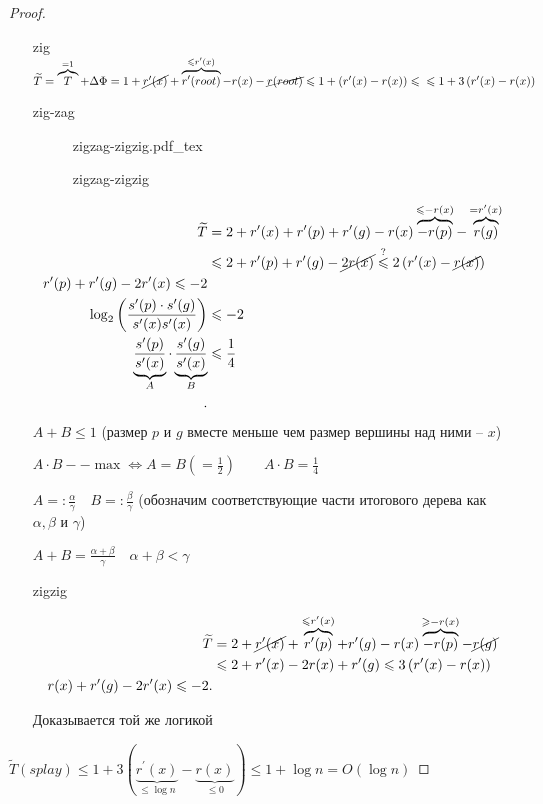 \documentclass{book}
\newcommand{\p}[1]{#1^{\prime}}
\theoremstyle{definition}
\newcommand{\ov}[2]{\overset{#1}{#2}}
\newcommand{\tl}[1]{\widetilde{#1}}
\newcommand{\incfig}[1]{%
    \def\svgwidth{\columnwidth}
    {#1.pdf_tex}
}
\begin{document}
\begin{proof}
    \begin{itemize}
        \item []
        \item [zig] $\tl T = \overbrace{T}^{=1} + \Delta \Phi = 1 + \cancel{\p r(x)} + \overbrace{\p r(root)}^{\leqslant \p r(x)} - r(x) - \cancel{r(root)} \leqslant 1 + \left( \p r(x) - r(x) \right) \leqslant\\\leqslant 1+ 3\left( \p r(x) - r(x) \right)  $
        \item [zig-zag] 
\begin{figure}[!ht]
    \centering
    \incfig{zigzag-zigzig}
    \caption{zigzag-zigzig}
\end{figure}
\begin{align*}
    \tl T &= 2 + \p r(x) + \p r(p) + \p r(g) - r(x) \overbrace{-r(p)}^{\leqslant -r(x)} - \overbrace{r(g)}^{=\p r(x)}\\
          &\leqslant  2+\p r(p) + \p r(g) - \cancel{2r(x)} \ov{?}{\leqslant} 2\left( \p r(x) - \cancel{r(x)} \right)  \\
    \p r(p) + \p r(g) - 2\p r(x) \leqslant -2\\
    \log _2\left( \frac{\p s(p)\cdot \p s(g)}{\p s(x)\p s(x)} \right) &\leqslant -2 \\
    \underbrace{\frac{\p s(p)}{\p s(x)}}_A\cdot \underbrace{\frac{\p s(g)}{\p s(x)}}_B&\leqslant \frac{1}{4}\\    
.\end{align*}
$A+B\leqslant 1$ (размер $p$ и $g$ вместе меньше чем размер вершины над ними --  $x$)

$A\cdot B -- \max \iff A=B(=\frac{1}{2})\qquad A\cdot B = \frac{1}{4}$ 

$A =: \frac{\alpha}{\gamma}\quad B =:\frac{\beta}{\gamma}$ (обозначим соответствующие части итогового дерева как $\alpha, \beta$ и  $\gamma$)

 $A + B = \frac{\alpha + \beta}{\gamma}\quad \alpha + \beta < \gamma$
 

    \item [zigzig]

    \begin{align*}
        \tl T & = 2 + \cancel{\p r(x)} + \overbrace{\p r(p)}^{\leqslant \p r(x)} + \p r(g) - r(x) \overbrace{- r(p)}^{\geqslant -r(x)} - \cancel{r(g)}\\
              &\leqslant 2 + \p r(x) - 2r(x) + \p r(g) \leqslant 3\left( \p r(x) - r(x) \right)   \\
              r(x) + \p r(g) - 2\p r(x) \leqslant -2
    .\end{align*}

    Доказывается той же логикой
    \end{itemize}

    $\tl T(splay) \leqslant  1 + 3\left( \underbrace{\p r(x)}_{\leqslant \log n} - \underbrace{r(x)}_{\leqslant 0} \right) \leqslant 1 + \log n = O\left( \log  n \right)  $
\end{proof}
\end{document}
